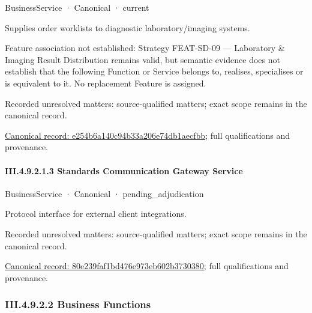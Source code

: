 \label{element:e254b6a140c94b33a206e74db1aecfbb}
{\small BusinessService · Canonical · current}\par

Supplies order worklists to diagnostic laboratory/imaging systems.



Feature association not established: Strategy FEAT-SD-09 — Laboratory \& Imaging Result Distribution remains valid, but semantic evidence does not establish that the following Function or Service belongs to, realises, specialises or is equivalent to it. No replacement Feature is assigned.


{\small Recorded unresolved matters: source-qualified matters; exact scope remains in the canonical record.}\par
{\footnotesize \href{../../../../continuum/business/business-service/e254b6a140c94b33a206e74db1aecfbb.md}{Canonical record: e254b6a140c94b33a206e74db1aecfbb}; full qualifications and provenance.}\par
\paragraph*{III.4.9.2.1.3 Standards Communication Gateway Service}
\label{navigation:III.4.9.2.1.3}

\label{element:80e239faf1bd476e973eb602b3730380}
{\small BusinessService · Canonical · pending\_adjudication}\par

Protocol interface for external client integrations.


{\small Recorded unresolved matters: source-qualified matters; exact scope remains in the canonical record.}\par
{\footnotesize \href{../../../../continuum/business/business-service/80e239faf1bd476e973eb602b3730380.md}{Canonical record: 80e239faf1bd476e973eb602b3730380}; full qualifications and provenance.}\par
\subsubsection*{III.4.9.2.2 Business Functions}
\label{navigation:III.4.9.2.2}

